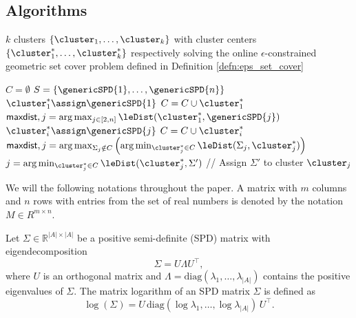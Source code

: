 \documentclass[pdflatex,sn-mathphys-num]{sn-jnl}%
\theoremstyle{thmstyleone}%
\theoremstyle{thmstyletwo}%
\theoremstyle{thmstylethree}%
\begin{document}
\begin{appendices}
\clearpage
\section{Algorithms}\label{secA1}

\newcommand{\maxDist}{\ensuremath{\mathsf{maxdist}}\xspace}


\begin{algorithm}[h]
\caption{$\epsilonKMeans(\{\genericSPD{1},\dots,\genericSPD{n}\},\epsilon$)}
\label{alg:epsilon_cover}
\begin{algorithmic}[1]
\footnotesize

\Require $k$ clusters $\{\cluster_1, \dots, \cluster_k\}$ with cluster centers $\{\cluster_1^{\ast}, \dots, \cluster_k^{\ast}\}$ respectively solving the online $\epsilon$-constrained geometric set cover problem defined in Definition \ref{defn:eps_set_cover}



\State $C = \emptyset$
\State $S = \{\genericSPD{1},\dots,\genericSPD{n}\}$
\State $\cluster_1^{\ast} \assign \genericSPD{1}$  
\State $C = C \cup \cluster_1^{\ast}$
\State $\maxDist, j = \arg\max_{j \in [2, n]} \leDist(\cluster_1^{\ast}, \genericSPD{j})$
\While{$\maxDist > \epsilon$}
\State $\cluster_i^{\ast} \assign  \genericSPD{j}$
\State $C = C \cup \cluster_i^{\ast}$
\State $\maxDist, j = \arg\max_{\Sigma_j \notin C} \left(\arg\min_{\cluster_j^{\ast} \in C} \leDist(\Sigma_j,\cluster_j^{\ast})\right)$
\EndWhile
{}
\State $j = \arg\min_{\cluster_j^{\ast} \in C} \leDist(\cluster_j^{\ast},\Sigma')$
\State // Assign $\Sigma'$ to cluster $\cluster_j$
\EndFor

\vspace{0.15em}
\end{algorithmic}
\end{algorithm}




%
We will the following notations throughout the paper. A matrix with $m$ columns and $n$ rows with entries from the set of real numbers is denoted by the notation $M \in R^{m  \times n}$. 





\begin{definition}
\label{prop:le_to_bd}
Let $\Sigma \in \mathbb{R}^{|A|\times |A|}$ be a positive semi-definite (SPD) matrix  with eigendecomposition 
\[
\Sigma = U \Lambda U^\top,
\]
where $U$ is an orthogonal matrix and $\Lambda = \mathrm{diag}(\lambda_1, \ldots, \lambda_{|A|})$ contains the positive eigenvalues of $\Sigma$. 
The matrix logarithm of an SPD matrix $\Sigma$ is defined as
\[
\log(\Sigma) = U\,\mathrm{diag}(\log \lambda_1, \ldots, \log \lambda_{|A|})\,U^\top.
\]
\end{definition}


\end{appendices}
\end{document}
